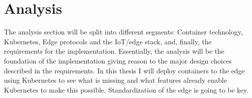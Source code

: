 \section{Analysis} \label{sec:analysis}
The analysis section will be split into different segments: Container technology, Kubernetes, Edge protocols and the IoT/edge stack, and, finally, the requirements for the implementation. Essentially, the analysis will be the foundation of the implementation giving reason to the major design choices described in the requirements.
In this thesis I will deploy containers to the edge using Kubernetes to see what is missing and what features already enable Kubernetes to make this possible.
Standardization of the edge is going to be key.

% 





